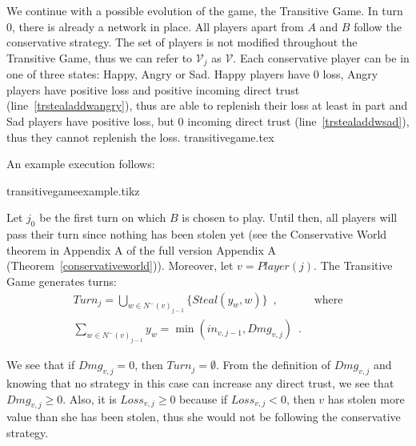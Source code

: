   We continue with a possible evolution of the game, the Transitive Game. In turn 0, there is already a network in place. All
  players apart from $A$ and $B$ follow the conservative strategy. The set of players is not modified throughout the
  Transitive Game, thus we can refer to $\mathcal{V}_j$ as $\mathcal{V}$. Each conservative player can be in one of three
  states: Happy, Angry or Sad. Happy players have 0 loss, Angry players have positive loss and positive incoming direct trust
  (line~\ref{trstealaddwangry}), thus are able to replenish their loss at least in part and Sad players have positive loss,
  but 0 incoming direct trust (line~\ref{trstealaddwsad}), thus they cannot replenish the loss.
  {transitivegame.tex}

  \noindent An example execution follows:

  {transitivegameexample.tikz}

  \noindent Let $j_0$ be the first turn on which $B$ is chosen to play. Until then, all players will pass their turn since
  nothing has been stolen yet (see \ifdefined\proceedings the Conservative World theorem in Appendix A of the full version
  \cite{trustisrisk}\else Appendix A (Theorem~\ref{conservativeworld})\fi). Moreover, let $v = Player(j)$. The Transitive
  Game generates turns:
  \begin{align}
     Turn_j = \bigcup\limits_{w \in N^{-}\left(v\right)_{j-1}}\{Steal\left(y_w,w\right)\} \enspace, & \mbox{ where} \\
     \sum\limits_{w \in N^{-}\left(v\right)_{j-1}}y_w = \min\left(in_{v, j-1}, Dmg_{v, j}\right) \enspace. &
  \end{align}
 
  \noindent We see that if $Dmg_{v, j} = 0$, then $Turn_j = \emptyset$. From the definition of $Dmg_{v,j}$ and knowing that no
  strategy in this case can increase any direct trust, we see that $Dmg_{v,j} \geq 0$. Also, it is $Loss_{v,j} \geq 0$ because
  if $Loss_{v,j} < 0$, then $v$ has stolen more value than she has been stolen, thus she would not be following the
  conservative strategy.
